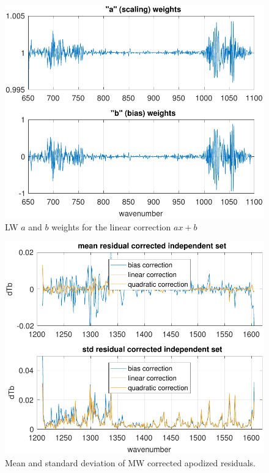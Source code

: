 \documentclass[10pt,twocolumn]{article}
\begin{document}
\begin{figure} %
  \centering
  \includegraphics[width=\linewidth]{figures/a2cris_coef_LW.pdf}
  \caption{LW $a$ and $b$ weights for the linear correction $ax+b$}
  \label{coefLW}
\end{figure}

\begin{figure} %
  \centering
  \includegraphics[width=\linewidth]{figures/a2cris_regr_MW.pdf}
  \caption{Mean and standard deviation of MW corrected apodized
    residuals.}
  \label{statMW}
\end{figure}
\end{document}
